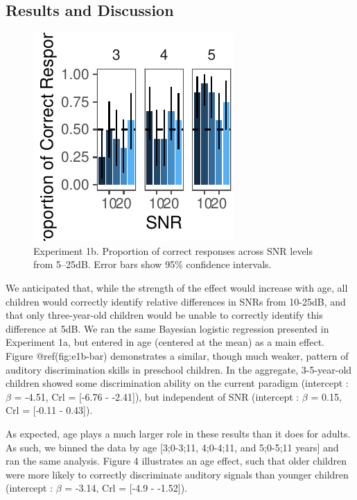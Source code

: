 \documentclass[10pt, letterpaper]{article}
\newenvironment{CodeChunk}{}{}
\begin{document}
\hypertarget{results-and-discussion-1}{%
\subsection{Results and Discussion}\label{results-and-discussion-1}}

\begin{CodeChunk}
\begin{figure}[H]

{\centering \includegraphics{figs/e1b-bar-1} 

}

\caption[Experiment 1b]{Experiment 1b. Proportion of correct responses across SNR levels from 5--25dB. Error bars show 95\% confidence intervals.}\label{fig:e1b-bar}
\end{figure}
\end{CodeChunk}

We anticipated that, while the strength of the effect would increase
with age, all children would correctly identify relative differences in
SNRs from 10-25dB, and that only three-year-old children would be unable
to correctly identify this difference at 5dB. We ran the same Bayesian
logistic regression presented in Experiment 1a, but entered in age
(centered at the mean) as a main effect. Figure @ref(fig:e1b-bar)
demonstrates a similar, though much weaker, pattern of auditory
discrimination skills in preschool children. In the aggregate,
3-5-year-old children showed some discrimination ability on the current
paradigm (intercept : \(\beta\) = -4.51, Crl = {[}-6.76 - -2.41{]}), but
independent of SNR (intercept : \(\beta\) = 0.15, Crl = {[}-0.11 -
0.43{]}).

As expected, age plays a much larger role in these results than it does
for adults. As such, we binned the data by age {[}3;0-3;11, 4;0-4;11,
and 5;0-5;11 years{]} and ran the same analysis. Figure 4 illustrates an
age effect, such that older children were more likely to correctly
discriminate auditory signals than younger children (intercept :
\(\beta\) = -3.14, Crl = {[}-4.9 - -1.52{]}).
\end{document}
